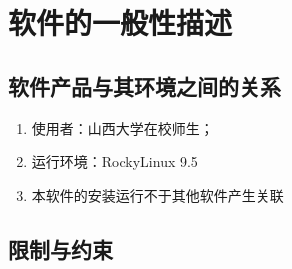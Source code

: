 \documentclass[
    report,     %
    oneside,    %
    UTF8,       %
    zihao=-4    %
]{config} %
\begin{document}
\section{软件的一般性描述}
\subsection{软件产品与其环境之间的关系}
\begin{enumerate}[label=(\arabic*)]
\item 使用者：山西大学在校师生；
\item 运行环境：RockyLinux 9.5
\item 本软件的安装运行不于其他软件产生关联
\end{enumerate}
\subsection{限制与约束}
\end{document}
